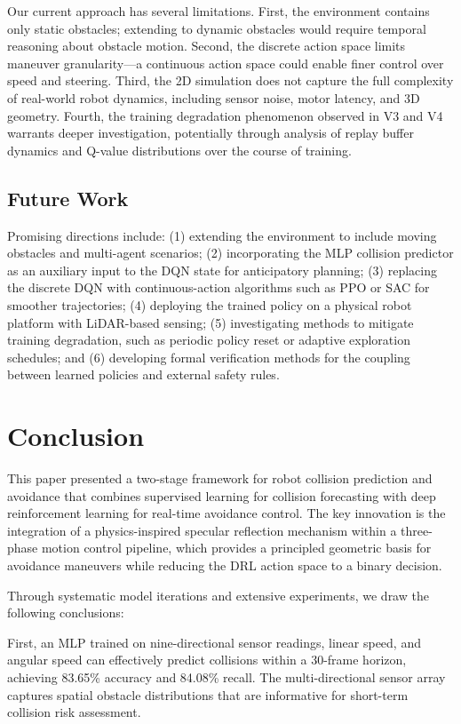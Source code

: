 \documentclass[conference]{IEEEtran}
\begin{document}
Our current approach has several limitations. First, the environment contains only static obstacles; extending to dynamic obstacles would require temporal reasoning about obstacle motion. Second, the discrete action space limits maneuver granularity---a continuous action space could enable finer control over speed and steering. Third, the 2D simulation does not capture the full complexity of real-world robot dynamics, including sensor noise, motor latency, and 3D geometry. Fourth, the training degradation phenomenon observed in V3 and V4 warrants deeper investigation, potentially through analysis of replay buffer dynamics and Q-value distributions over the course of training.

\subsection{Future Work}

Promising directions include: (1) extending the environment to include moving obstacles and multi-agent scenarios; (2) incorporating the MLP collision predictor as an auxiliary input to the DQN state for anticipatory planning; (3) replacing the discrete DQN with continuous-action algorithms such as PPO or SAC for smoother trajectories; (4) deploying the trained policy on a physical robot platform with LiDAR-based sensing; (5) investigating methods to mitigate training degradation, such as periodic policy reset or adaptive exploration schedules; and (6) developing formal verification methods for the coupling between learned policies and external safety rules.

\section{Conclusion}

This paper presented a two-stage framework for robot collision prediction and avoidance that combines supervised learning for collision forecasting with deep reinforcement learning for real-time avoidance control. The key innovation is the integration of a physics-inspired specular reflection mechanism within a three-phase motion control pipeline, which provides a principled geometric basis for avoidance maneuvers while reducing the DRL action space to a binary decision.

Through systematic model iterations and extensive experiments, we draw the following conclusions:

First, an MLP trained on nine-directional sensor readings, linear speed, and angular speed can effectively predict collisions within a 30-frame horizon, achieving 83.65\% accuracy and 84.08\% recall. The multi-directional sensor array captures spatial obstacle distributions that are informative for short-term collision risk assessment.
\end{document}
